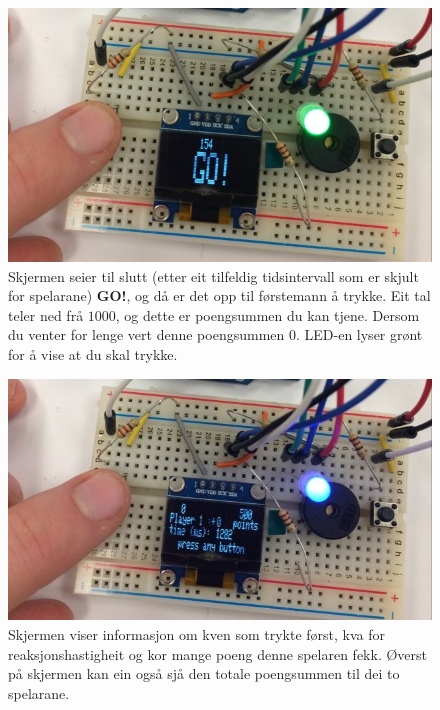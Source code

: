 \documentclass[journal]{IEEEtran}
\begin{document}
  \begin{figure}[!h]
    \begin{center}
      \includegraphics[scale=0.2]{03_go}
      \caption{Skjermen seier til slutt (etter eit tilfeldig tidsintervall som
      er skjult for spelarane) \textbf{GO!}, og då er det opp til førstemann å
      trykke. Eit tal teler ned frå $1000$, og dette er poengsummen du kan
      tjene. Dersom du venter for lenge vert denne poengsummen $0$. LED-en
      lyser grønt for å vise at du skal trykke.}
    \end{center}
  \end{figure}
  \begin{figure}[!h]
    \begin{center}
      \includegraphics[scale=0.2]{03_announce}
      \caption{ Skjermen viser informasjon om kven som trykte først, kva for
      reaksjonshastigheit og kor mange poeng denne spelaren fekk. Øverst på
      skjermen kan ein også sjå den totale poengsummen til dei to spelarane.}
    \end{center}
  \end{figure}
\end{document}
